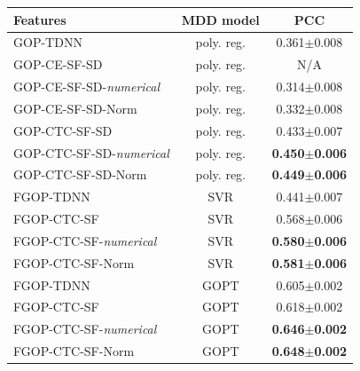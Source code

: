 \begin{tabular}{ lcc  }
 \hline\hline
 Features & MDD model & PCC \\
 \hline
 GOP-TDNN~\cite{cao24b_interspeech} & poly. reg. &0.361$\pm$0.008 \\
 GOP-CE-SF-SD & poly. reg. & N/A\\
GOP-CE-SF-SD-\textit{numerical}&poly. reg. & 0.314$\pm$0.008 \\
GOP-CE-SF-SD-Norm& poly. reg. & 0.332$\pm$0.008 \\
GOP-CTC-SF-SD~\cite{cao24b_interspeech}& poly. reg. & 0.433$\pm$0.007 \\
GOP-CTC-SF-SD-\textit{numerical}&poly. reg. & \textbf{0.450}$\pm$\textbf{0.006} \\
GOP-CTC-SF-SD-Norm& poly. reg. & \textbf{0.449}$\pm$\textbf{0.006} \\
 \hline
 FGOP-TDNN~\cite{speechocean762}& SVR &0.441$\pm$0.007 \\
 FGOP-CTC-SF~\cite{cao24b_interspeech}& SVR &0.568$\pm$0.006 \\
FGOP-CTC-SF-\textit{numerical}&SVR&\textbf{0.580$\pm$0.006} \\
FGOP-CTC-SF-Norm&SVR&\textbf{0.581$\pm$0.006} \\
 \hline
  FGOP-TDNN~\cite{GOPT} & GOPT & 0.605$\pm$0.002 \\
  FGOP-CTC-SF~\cite{cao24b_interspeech} & GOPT & 0.618$\pm$0.002 \\
  FGOP-CTC-SF-\textit{numerical} & GOPT & \textbf{0.646}$\pm$\textbf{0.002} \\
  FGOP-CTC-SF-Norm & GOPT & \textbf{0.648}$\pm$\textbf{0.002} \\
     \hline\hline
\end{tabular}
